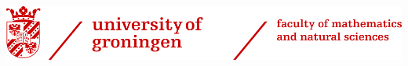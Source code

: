 \begin{titlepage}
    \begin{addmargin}[-1cm]{-3cm}
    \begin{center}
        \large  

        \hfill

        \includegraphics[width=1.3\textwidth]{gfx/rug_logo} \\ \medskip

        \vfill
        \vfill

        \begingroup
            \color{Maroon}\spacedallcaps{\myTitle} \\ \bigskip
        \endgroup

        \spacedlowsmallcaps{\myName}

        \vfill
        \vfill


        \mySubtitle \\ \medskip   
        \myFaculty \\
        \myUni \\ \bigskip

        \myTime\ %


    \end{center}  
  \end{addmargin}       
\end{titlepage}   